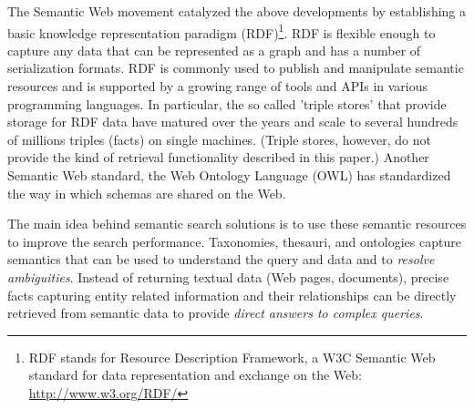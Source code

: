 The Semantic Web movement catalyzed the above developments by establishing a basic knowledge representation paradigm (RDF)\footnote{RDF stands for Resource Description Framework, a W3C Semantic Web standard for data representation and exchange on the Web: \url{http://www.w3.org/RDF/}}. RDF is flexible enough to capture any data that can be represented as a graph and has a number of serialization formats. RDF is commonly used to publish and manipulate semantic resources and is supported by a growing range of tools and APIs in various programming languages. In particular, the so called 'triple stores' that provide storage for RDF data have matured over the years and scale to several hundreds of millions triples (facts) on single machines. (Triple stores, however, do not provide the kind of retrieval functionality described in this paper.) Another Semantic Web standard, the Web Ontology Language (OWL) has standardized the way in which schemas are shared on the Web.



The main idea behind semantic search solutions is to use these semantic resources to improve the search performance. Taxonomies, thesauri, and ontologies capture semantics that can be used to understand the query and data and to \emph{resolve ambiguities}. Instead of returning textual data (Web pages, documents), precise facts capturing entity related information and their relationships can be directly retrieved from semantic data to provide \emph{direct answers to complex queries}. 

